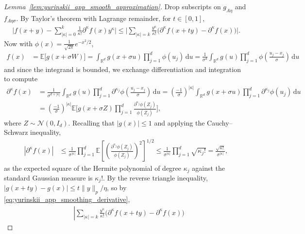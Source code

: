 \documentclass[11pt,lof]{puthesis}
\newcommand{\R}{\ensuremath{\mathbb{R}}}
\newcommand{\E}{\ensuremath{\mathbb{E}}}
\newcommand{\cN}{\ensuremath{\mathcal{N}}}
\newcommand{\diff}[1]{\,\mathrm{d}#1}
\theoremstyle{break}
\theoremstyle{proof}
\newtheorem{proof}{Proof}
\begin{document}
\begin{proof}[Lemma~\ref{lem:yurinskii_app_smooth_approximation}]
Drop subscripts on $g_{A\eta}$ and $f_{A \eta \sigma}$.
By Taylor's theorem with Lagrange remainder, for $t \in [0,1]$,
%
\begin{align*}
\Bigg|
f(x + y)
- \sum_{|\kappa|=0}^{k}
\frac{1}{\kappa!}
\partial^{\kappa} f(x)
y^\kappa
\Bigg|
\leq
\Bigg|
\sum_{|\kappa|=k}
\frac{y^\kappa}{\kappa!}
\big(
\partial^{\kappa} f(x + t y)
- \partial^{\kappa} f(x)
\big)
\Bigg|.
\end{align*}
%
Now with $\phi(x) = \frac{1}{\sqrt{2 \pi}} e^{-x^2/2}$,
%
\begin{align*}
f(x)
&=
\E\big[g(x + \sigma W) \big]
=
\int_{\R^d}
g(x + \sigma u)
\prod_{j=1}^{d}
\phi(u_j)
\diff u
=
\frac{1}{\sigma^d}
\int_{\R^d}
g(u)
\prod_{j=1}^{d}
\phi \left( \frac{u_j-x_j}{\sigma} \right)
\diff u
\end{align*}
%
and since the integrand is bounded, we exchange differentiation and
integration to compute
%
\begin{align}
\nonumber
\partial^\kappa
f(x)
&=
\frac{1}{\sigma^{d+|\kappa|}}
\int_{\R^d}
g(u)
\prod_{j=1}^{d}
\partial^{\kappa_j}
\phi \left( \frac{u_j-x_j}{\sigma} \right)
\diff u
= \left( \frac{-1}{\sigma} \right)^{|\kappa|}
\int_{\R^d}
g(x + \sigma u)
\prod_{j=1}^{d}
\partial^{\kappa_j}
\phi(u_j)
\diff u \\
\label{eq:yurinskii_app_smoothing_derivative}
&=
\left( \frac{-1}{\sigma} \right)^{|\kappa|}
\E \Bigg[
g(x + \sigma Z)
\prod_{j=1}^{d}
\frac{\partial^{\kappa_j}\phi(Z_j)}{\phi(Z_j)}
\Bigg],
\end{align}
%
where $Z \sim \cN(0, I_d)$.
Recalling that $|g(x)| \leq 1$ and applying the Cauchy--Schwarz inequality,
%
\begin{align*}
\left|
\partial^\kappa
f(x)
\right|
&\leq
\frac{1}{\sigma^{|\kappa|}}
\prod_{j=1}^{d}
\E \left[
\left(
\frac{\partial^{\kappa_j}\phi(Z_j)}{\phi(Z_j)}
\right)^2
\right]^{1/2}
\leq
\frac{1}{\sigma^{|\kappa|}}
\prod_{j=1}^{d}
\sqrt{\kappa_j!}
=
\frac{\sqrt{\kappa!}}{\sigma^{|\kappa|}},
\end{align*}
%
as the expected square of the Hermite polynomial of degree
$\kappa_j$ against the standard Gaussian measure is $\kappa_j!$. By the
reverse triangle inequality, $|g(x + t y) - g(x)| \leq t \|y\|_p / \eta$,
so by \eqref{eq:yurinskii_app_smoothing_derivative},
%
\begin{align*}
&\left|
\sum_{|\kappa|=k}
\frac{y^\kappa}{\kappa!}
\big(
\partial^{\kappa} f(x + t y)
- \partial^{\kappa} f(x)
\big)

\end{align*}
\end{proof}
\end{document}
